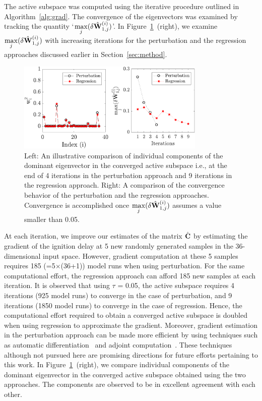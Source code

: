 The active subspace was computed using the iterative procedure outlined in 
Algorithm~\ref{alg:grad}. The convergence of the eigenvectors was examined
by tracking the quantity `$\max\limits_j(\delta \hat{\mathbf{{W}}}_{1,j}^{(i)})$'. 
In Figure~\ref{fig:conv_app}~(right), we examine $\max\limits_j(\delta \hat{\mathbf{{W}}}_{1,j}^{(i)})$
with increasing iterations for the perturbation and the regression approaches 
discussed earlier in Section~\ref{sec:method}. 
%
\begin{figure}[htbp]
 \begin{center}
  \includegraphics[width=0.8\textwidth]{./Figures/eig_conv36Dp2}
\caption{Left: An illustrative comparison of individual components of the 
dominant eigenvector in the converged active subspace i.e., at the end
of 4 iterations in the perturbation approach and 9 iterations in the
regression approach. Right: A comparison of the convergence behavior
of the perturbation and the
regression approaches. Convergence is accomplished once 
$\max\limits_j(\delta \hat{\mathbf{{W}}}_{1,j}^{(i)})$ assumes a value smaller
than 0.05.}
\label{fig:conv_app}
\end{center}
\end{figure}
%
At each iteration, we improve our estimates of the matrix $\hat{\mathbf{{C}}}$ by
estimating the gradient of the ignition delay at 5 new randomly generated samples 
in the 36-dimensional input space. However, gradient computation at these
5 samples requires 185 (=5$\times$(36+1)) model runs when using perturbation. 
For the same computational effort, the regression approach can afford 185 new
samples at each iteration. It is observed that using $\tau$ = 0.05, the 
active subspace requires 4 iterations (925 model runs) to converge in the case of perturbation, and
9 iterations (1850 model runs) to converge in the case of regression. Hence, the computational effort
required to obtain a converged active subspace is doubled when using
regression to approximate the gradient. Moreover, gradient estimation in the perturbation approach
can be made more efficient by using techniques such as automatic differentiation~\cite{Kiparissides:2009}
and adjoint computation~\cite{Jameson:1988}. These techniques although not pursued here are 
promising directions for
future efforts pertaining to this work. In Figure~\ref{fig:conv_app}~(right), we compare
individual components of the dominant eigenvector in the converged active subspace
obtained using the two approaches. The components are observed to be in excellent
agreement with each other.

